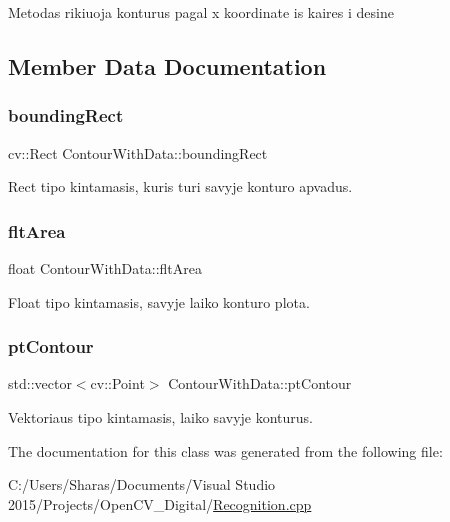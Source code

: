 Metodas rikiuoja konturus pagal x koordinate is kaires i desine 

\subsection{Member Data Documentation}
\mbox{\label{class_contour_with_data_ab2bebe42d7353d50fe515bd25c561247}} 
\subsubsection{\texorpdfstring{bounding\+Rect}{boundingRect}}
{\footnotesize\ttfamily cv\+::\+Rect Contour\+With\+Data\+::bounding\+Rect}



Rect tipo kintamasis, kuris turi savyje konturo apvadus. 

\mbox{\label{class_contour_with_data_a640536a3a32dd02f85e6a5f70ddfe7e3}} 
\subsubsection{\texorpdfstring{flt\+Area}{fltArea}}
{\footnotesize\ttfamily float Contour\+With\+Data\+::flt\+Area}



Float tipo kintamasis, savyje laiko konturo plota. 

\mbox{\label{class_contour_with_data_a28f63c52d8383623adc00e4481e6b9aa}} 
\subsubsection{\texorpdfstring{pt\+Contour}{ptContour}}
{\footnotesize\ttfamily std\+::vector$<$cv\+::\+Point$>$ Contour\+With\+Data\+::pt\+Contour}



Vektoriaus tipo kintamasis, laiko savyje konturus. 



The documentation for this class was generated from the following file\+:\begin{DoxyCompactItemize}
\item 
C\+:/\+Users/\+Sharas/\+Documents/\+Visual Studio 2015/\+Projects/\+Open\+C\+V\+\_\+\+Digital/\hyperlink{_recognition_8cpp}{Recognition.\+cpp}\end{DoxyCompactItemize}
